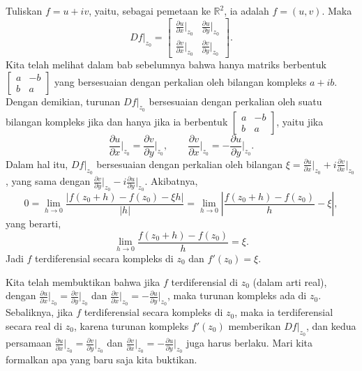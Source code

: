 \documentclass[12pt,openany]{book}
\newcommand{\sabs}[1]{\lvert {#1} \rvert}
\newcommand{\abs}[1]{\left\lvert {#1} \right\rvert}
\newcommand{\R}{{\mathbb{R}}}
\theoremstyle{plain}
\theoremstyle{remark}
\theoremstyle{definition}
\theoremstyle{exercise}
\theoremstyle{example}
\begin{document}
Tuliskan $f = u+iv$, yaitu, sebagai
pemetaan ke $\R^2$, ia adalah $f = (u,v)$.  Maka
\begin{equation*}
Df|_{z_0} =
\begin{bmatrix}
\frac{\partial u}{\partial x}\big|_{z_0} & \frac{\partial u}{\partial
y}\big|_{z_0} \\[5pt]
\frac{\partial v}{\partial x}\big|_{z_0} & \frac{\partial v}{\partial y}\big|_{z_0}
\end{bmatrix} .
\end{equation*}
Kita telah melihat dalam bab sebelumnya bahwa hanya matriks berbentuk
$\left[ \begin{smallmatrix}
a & -b \\ b & a
\end{smallmatrix} \right]$ yang bersesuaian dengan perkalian
oleh bilangan kompleks $a+ib$.
Dengan demikian, turunan $Df|_{z_0}$ bersesuaian dengan perkalian oleh suatu
bilangan kompleks jika dan hanya jika ia berbentuk
$\left[ \begin{smallmatrix}
a & -b \\ b & a
\end{smallmatrix} \right]$, yaitu jika
\begin{equation*}
\frac{\partial u}{\partial x}\Big|_{z_0} =
\frac{\partial v}{\partial y}\Big|_{z_0}
, \qquad
\frac{\partial v}{\partial x}\Big|_{z_0} =
-\frac{\partial u}{\partial y}\Big|_{z_0} .
\end{equation*}
Dalam hal itu, $Df|_{z_0}$ bersesuaian dengan perkalian oleh bilangan
$\xi = \frac{\partial u}{\partial x}\big|_{z_0} + i \frac{\partial v}{\partial
x}\big|_{z_0}$, yang sama dengan
$\frac{\partial v}{\partial y}\big|_{z_0} - i \frac{\partial u}{\partial
y}\big|_{z_0}$.
Akibatnya,
\begin{equation*}
0 = \lim_{h \to 0} \frac{\sabs{f(z_0+h) - f(z_0) - \xi h}}{\sabs{h}} =
\lim_{h \to 0} \abs{\frac{f(z_0+h) - f(z_0)}{h} - \xi} ,
\end{equation*}
yang berarti,
\begin{equation*}
\lim_{h \to 0} \frac{f(z_0+h) - f(z_0)}{h} = \xi .
\end{equation*}
Jadi $f$ terdiferensial secara kompleks di $z_0$ dan $f'(z_0) = \xi$.

Kita telah membuktikan bahwa jika $f$ terdiferensial di $z_0$ (dalam arti real),
dengan
$\frac{\partial u}{\partial x}\big|_{z_0} = \frac{\partial v}{\partial
y}\big|_{z_0}$ dan $\frac{\partial v}{\partial x}\big|_{z_0} = -\frac{\partial
u}{\partial y}\big|_{z_0}$, maka
turunan kompleks ada di $z_0$.
Sebaliknya,
jika $f$ terdiferensial secara kompleks di $z_0$, maka ia terdiferensial secara real
di $z_0$,
karena turunan kompleks $f'(z_0)$ memberikan $Df|_{z_0}$, dan kedua
persamaan
$\frac{\partial u}{\partial x}\big|_{z_0} = \frac{\partial v}{\partial
y}\big|_{z_0}$ dan $\frac{\partial v}{\partial x}\big|_{z_0} = -\frac{\partial
u}{\partial y}\big|_{z_0}$
juga harus berlaku.
Mari kita formalkan
apa yang baru saja kita buktikan.
\end{document}
